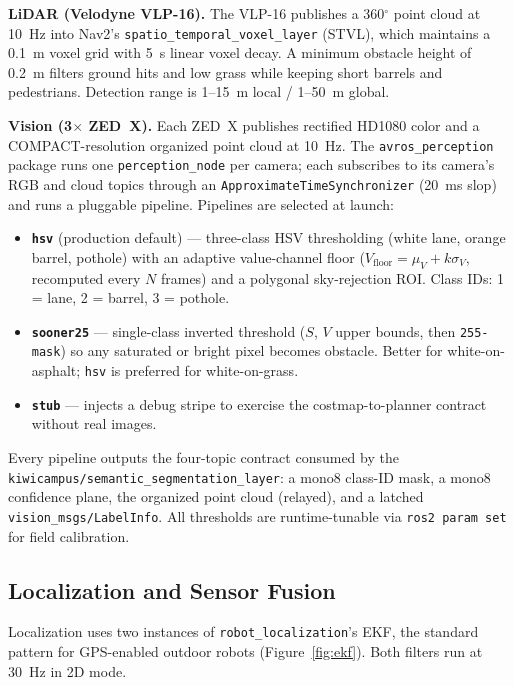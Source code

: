 \documentclass[11pt, letterpaper]{article}
\begin{document}
\textbf{LiDAR (Velodyne VLP-16).} The VLP-16 publishes a 360$^\circ$ point cloud at 10~Hz
into Nav2's \texttt{spatio\_temporal\_voxel\_layer} (STVL), which maintains a 0.1~m voxel
grid with 5~s linear voxel decay. A minimum obstacle height of 0.2~m filters ground hits
and low grass while keeping short barrels and pedestrians. Detection range is 1--15~m
local / 1--50~m global.

\textbf{Vision (3$\times$ ZED~X).} Each ZED~X publishes rectified HD1080 color and a
COMPACT-resolution organized point cloud at 10~Hz. The \texttt{avros\_perception} package
runs one \texttt{perception\_node} per camera; each subscribes to its camera's RGB and cloud
topics through an \texttt{ApproximateTimeSynchronizer} (20~ms slop) and runs a pluggable
pipeline. Pipelines are selected at launch:

\begin{itemize}
    \item \textbf{\texttt{hsv}} (production default) --- three-class HSV thresholding (white lane, orange barrel, pothole) with an adaptive value-channel floor ($V_{\text{floor}} = \mu_V + k\sigma_V$, recomputed every $N$ frames) and a polygonal sky-rejection ROI. Class IDs: 1 = lane, 2 = barrel, 3 = pothole.
    \item \textbf{\texttt{sooner25}} --- single-class inverted threshold ($S$, $V$ upper bounds, then \texttt{255-mask}) so any saturated or bright pixel becomes obstacle. Better for white-on-asphalt; \texttt{hsv} is preferred for white-on-grass.
    \item \textbf{\texttt{stub}} --- injects a debug stripe to exercise the costmap-to-planner contract without real images.
\end{itemize}

Every pipeline outputs the four-topic contract consumed by the
\texttt{kiwicampus/semantic\_segmentation\_layer}: a mono8 class-ID mask, a mono8 confidence
plane, the organized point cloud (relayed), and a latched \texttt{vision\_msgs/LabelInfo}.
All thresholds are runtime-tunable via \texttt{ros2 param set} for field calibration.

\subsection{Localization and Sensor Fusion}
\label{sec:localization}

Localization uses two instances of \texttt{robot\_localization}'s EKF, the standard pattern
for GPS-enabled outdoor robots (Figure~\ref{fig:ekf}). Both filters run at 30~Hz in 2D mode.
\end{document}
